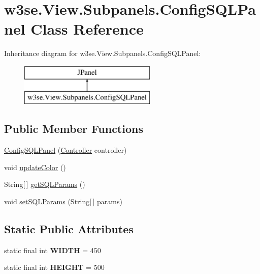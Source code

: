 \hypertarget{classw3se_1_1_view_1_1_subpanels_1_1_config_s_q_l_panel}{\section{w3se.\-View.\-Subpanels.\-Config\-S\-Q\-L\-Panel Class Reference}
\label{classw3se_1_1_view_1_1_subpanels_1_1_config_s_q_l_panel}
}
Inheritance diagram for w3se.\-View.\-Subpanels.\-Config\-S\-Q\-L\-Panel\-:\begin{figure}[H]
\begin{center}
\leavevmode
\includegraphics[height=2.000000cm]{classw3se_1_1_view_1_1_subpanels_1_1_config_s_q_l_panel}
\end{center}
\end{figure}
\subsection*{Public Member Functions}
\begin{DoxyCompactItemize}
\item 
\hyperlink{classw3se_1_1_view_1_1_subpanels_1_1_config_s_q_l_panel_a1e423f382b1609a457edf2f5d3ee45fb}{Config\-S\-Q\-L\-Panel} (\hyperlink{interfacew3se_1_1_controller_1_1_controller}{Controller} controller)
\item 
void \hyperlink{classw3se_1_1_view_1_1_subpanels_1_1_config_s_q_l_panel_a49a1010c535f54910f1b8c731b3fa28b}{update\-Color} ()
\item 
String\mbox{[}$\,$\mbox{]} \hyperlink{classw3se_1_1_view_1_1_subpanels_1_1_config_s_q_l_panel_acb5a9f4d71e6dce09aefaa5718a3dba0}{get\-S\-Q\-L\-Params} ()
\item 
void \hyperlink{classw3se_1_1_view_1_1_subpanels_1_1_config_s_q_l_panel_a9b386f0fa41000b7d3b45f7b3519b8c2}{set\-S\-Q\-L\-Params} (String\mbox{[}$\,$\mbox{]} params)
\end{DoxyCompactItemize}
\subsection*{Static Public Attributes}
\begin{DoxyCompactItemize}
\item 
\hypertarget{classw3se_1_1_view_1_1_subpanels_1_1_config_s_q_l_panel_a12a5409bacb91fe7383c63a1208cea85}{static final int {\bfseries W\-I\-D\-T\-H} = 450}\label{classw3se_1_1_view_1_1_subpanels_1_1_config_s_q_l_panel_a12a5409bacb91fe7383c63a1208cea85}

\item 
\hypertarget{classw3se_1_1_view_1_1_subpanels_1_1_config_s_q_l_panel_a1768470d6a67bb1fe0d7b61a6d53fab9}{static final int {\bfseries H\-E\-I\-G\-H\-T} = 500}\label{classw3se_1_1_view_1_1_subpanels_1_1_config_s_q_l_panel_a1768470d6a67bb1fe0d7b61a6d53fab9}

\end{DoxyCompactItemize}


